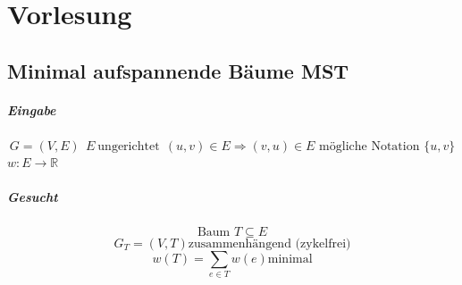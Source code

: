 \chapter{Vorlesung}
\section{Minimal aufspannende Bäume MST}	%
\paragraph{Eingabe}
\[ G=(V,E)~~E~\text{ungerichtet}~~(u,v)\in E \Rightarrow (v,u)\in E\text{ mögliche Notation } \{ u,v \} \]
$ w:E\rightarrow \mathbb{R}$
\paragraph{Gesucht}
\[ \text{Baum }T \subseteq E\]
\[ G_T=(V,T) \text{zusammenhängend (zykelfrei)} \]
\[ w(T) = \sum_{e\in T} w(e) \text{minimal} \]
